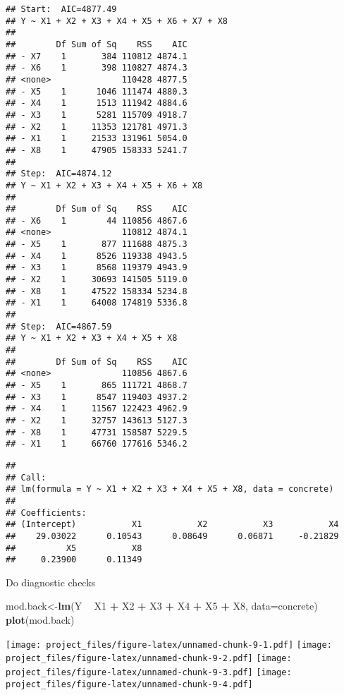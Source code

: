 \documentclass[]{article}
\newenvironment{Shaded}{\begin{snugshade}}{\end{snugshade}}
\newcommand{\KeywordTok}[1]{\textcolor[rgb]{0.13,0.29,0.53}{\textbf{#1}}}
\newcommand{\DataTypeTok}[1]{\textcolor[rgb]{0.13,0.29,0.53}{#1}}
\newcommand{\StringTok}[1]{\textcolor[rgb]{0.31,0.60,0.02}{#1}}
\newcommand{\OperatorTok}[1]{\textcolor[rgb]{0.81,0.36,0.00}{\textbf{#1}}}
\newcommand{\NormalTok}[1]{#1}
\begin{document}
\begin{verbatim}
## Start:  AIC=4877.49
## Y ~ X1 + X2 + X3 + X4 + X5 + X6 + X7 + X8
## 
##        Df Sum of Sq    RSS    AIC
## - X7    1       384 110812 4874.1
## - X6    1       398 110827 4874.3
## <none>              110428 4877.5
## - X5    1      1046 111474 4880.3
## - X4    1      1513 111942 4884.6
## - X3    1      5281 115709 4918.7
## - X2    1     11353 121781 4971.3
## - X1    1     21533 131961 5054.0
## - X8    1     47905 158333 5241.7
## 
## Step:  AIC=4874.12
## Y ~ X1 + X2 + X3 + X4 + X5 + X6 + X8
## 
##        Df Sum of Sq    RSS    AIC
## - X6    1        44 110856 4867.6
## <none>              110812 4874.1
## - X5    1       877 111688 4875.3
## - X4    1      8526 119338 4943.5
## - X3    1      8568 119379 4943.9
## - X2    1     30693 141505 5119.0
## - X8    1     47522 158334 5234.8
## - X1    1     64008 174819 5336.8
## 
## Step:  AIC=4867.59
## Y ~ X1 + X2 + X3 + X4 + X5 + X8
## 
##        Df Sum of Sq    RSS    AIC
## <none>              110856 4867.6
## - X5    1       865 111721 4868.7
## - X3    1      8547 119403 4937.2
## - X4    1     11567 122423 4962.9
## - X2    1     32757 143613 5127.3
## - X8    1     47731 158587 5229.5
## - X1    1     66760 177616 5346.2
\end{verbatim}

\begin{verbatim}
## 
## Call:
## lm(formula = Y ~ X1 + X2 + X3 + X4 + X5 + X8, data = concrete)
## 
## Coefficients:
## (Intercept)           X1           X2           X3           X4  
##    29.03022      0.10543      0.08649      0.06871     -0.21829  
##          X5           X8  
##     0.23900      0.11349
\end{verbatim}

Do diagnostic checks

\begin{Shaded}
\begin{Highlighting}[]
\NormalTok{mod.back<-}\KeywordTok{lm}\NormalTok{(Y }\OperatorTok{~}\StringTok{ }\NormalTok{X1 }\OperatorTok{+}\StringTok{ }\NormalTok{X2 }\OperatorTok{+}\StringTok{ }\NormalTok{X3 }\OperatorTok{+}\StringTok{ }\NormalTok{X4 }\OperatorTok{+}\StringTok{ }\NormalTok{X5 }\OperatorTok{+}\StringTok{ }\NormalTok{X8, }\DataTypeTok{data=}\NormalTok{concrete)}
\KeywordTok{plot}\NormalTok{(mod.back)}
\end{Highlighting}
\end{Shaded}

\texttt{[image: project\_files/figure-latex/unnamed-chunk-9-1.pdf]}
\texttt{[image: project\_files/figure-latex/unnamed-chunk-9-2.pdf]}
\texttt{[image: project\_files/figure-latex/unnamed-chunk-9-3.pdf]}
\texttt{[image: project\_files/figure-latex/unnamed-chunk-9-4.pdf]}
\end{document}
